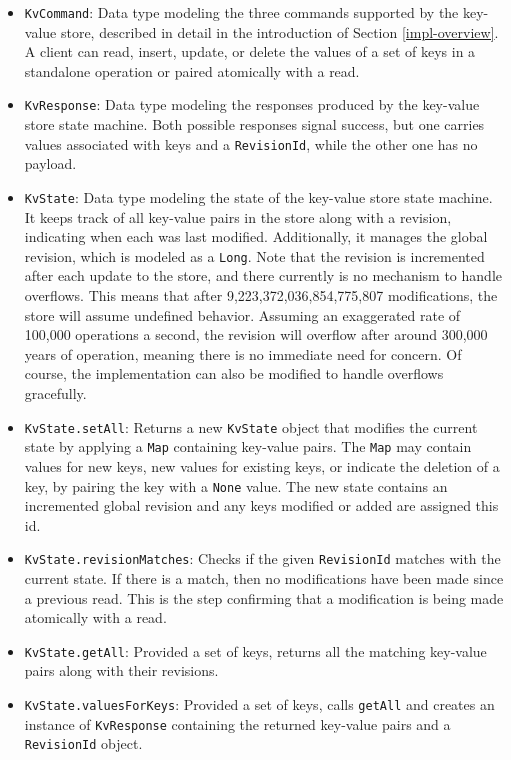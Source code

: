\begin{itemize}
    \item \lstinline|KvCommand|: Data type modeling the three commands supported by the key-value store, described in detail in the introduction of Section \ref{impl-overview}. A client can read, insert, update, or delete the values of a set of keys in a standalone operation or paired atomically with a read.
    \item \lstinline|KvResponse|: Data type modeling the responses produced by the key-value store state machine. Both possible responses signal success, but one carries values associated with keys and a \lstinline|RevisionId|, while the other one has no payload.
    \item \lstinline|KvState|: Data type modeling the state of the key-value store state machine. It keeps track of all key-value pairs in the store along with a revision, indicating when each was last modified. Additionally, it manages the global revision, which is modeled as a \lstinline|Long|. Note that the revision is incremented after each update to the store, and there currently is no mechanism to handle overflows. This means that after 9,223,372,036,854,775,807 modifications, the store will assume undefined behavior. Assuming an exaggerated rate of 100,000 operations a second, the revision will overflow after around 300,000 years of operation, meaning there is no immediate need for concern. Of course, the implementation can also be modified to handle overflows gracefully.
    \item \lstinline|KvState.setAll|: Returns a new \lstinline|KvState| object that modifies the current state by applying a \lstinline|Map| containing key-value pairs. The \lstinline|Map| may contain values for new keys, new values for existing keys, or indicate the deletion of a key, by pairing the key with a \lstinline|None| value. The new state contains an incremented global revision and any keys modified or added are assigned this id.
    \item \lstinline|KvState.revisionMatches|: Checks if the given \lstinline|RevisionId| matches with the current state. If there is a match, then no modifications have been made since a previous read. This is the step confirming that a modification is being made atomically with a read.
    \item \lstinline|KvState.getAll|: Provided a set of keys, returns all the matching key-value pairs along with their revisions.
    \item \lstinline|KvState.valuesForKeys|: Provided a set of keys, calls \lstinline|getAll| and creates an instance of \lstinline|KvResponse| containing the returned key-value pairs and a \lstinline|RevisionId| object.

\end{itemize}

